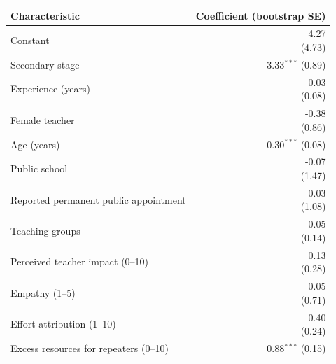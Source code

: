 \begin{tabular}{lr}
\toprule
Characteristic & Coefficient (bootstrap SE) \\
\midrule
Constant & \shortstack{4.27\\{\scriptsize (4.73)}} \\
Secondary stage & \shortstack{3.33$^{***}$\\{\scriptsize (0.89)}} \\
Experience (years) & \shortstack{0.03\\{\scriptsize (0.08)}} \\
Female teacher & \shortstack{-0.38\\{\scriptsize (0.86)}} \\
Age (years) & \shortstack{-0.30$^{***}$\\{\scriptsize (0.08)}} \\
Public school & \shortstack{-0.07\\{\scriptsize (1.47)}} \\
Reported permanent public appointment & \shortstack{0.03\\{\scriptsize (1.08)}} \\
Teaching groups & \shortstack{0.05\\{\scriptsize (0.14)}} \\
Perceived teacher impact (0--10) & \shortstack{0.13\\{\scriptsize (0.28)}} \\
Empathy (1--5) & \shortstack{0.05\\{\scriptsize (0.71)}} \\
Effort attribution (1--10) & \shortstack{0.40\\{\scriptsize (0.24)}} \\
Excess resources for repeaters (0--10) & \shortstack{0.88$^{***}$\\{\scriptsize (0.15)}} \\
\bottomrule
\end{tabular}
